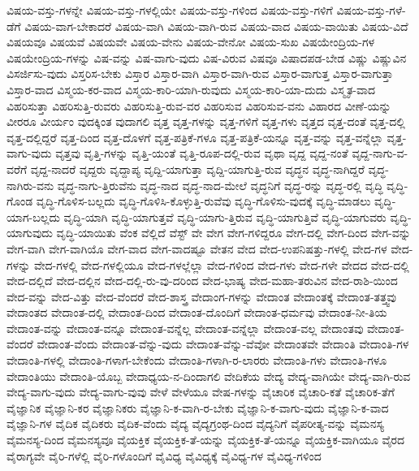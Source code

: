 {ವಿಷಯ-ವಸ್ತು-ಗಳನ್ನೇ
ವಿಷಯ-ವಸ್ತು-ಗಳಲ್ಲಿಯೇ
ವಿಷಯ-ವಸ್ತು-ಗಳಿಂದ
ವಿಷಯ-ವಸ್ತು-ಗಳಿಗೆ
ವಿಷಯ-ವಸ್ತು-ಗಳೆ-ಡೆಗೆ
ವಿಷಯ-ವಾಗ-ಬೇಕಾದರೆ
ವಿಷಯ-ವಾಗಿ
ವಿಷಯ-ವಾಗಿ-ರುವ
ವಿಷಯ-ವಾದ
ವಿಷಯ-ವಾಯಿತು
ವಿಷಯ-ವಿದೆ
ವಿಷಯವೂ
ವಿಷಯವೆ
ವಿಷಯವೇ
ವಿಷಯ-ವೇನು
ವಿಷಯ-ವೇನೋ
ವಿಷಯ-ಸುಖ
ವಿಷಯೇಂದ್ರಿಯ-ಗಳ
ವಿಷಯೇಂದ್ರಿಯ-ಗಳನ್ನು
ವಿಷ-ವನ್ನು
ವಿಷ-ವಾಗು-ವುದು
ವಿಷ-ವಿರುವ
ವಿಷವೂ
ವಿಷಾದಪಡ-ಬೇಡ
ವಿಷ್ಣು
ವಿಷ್ಣುವಿನ
ವಿಸರ್ಜಿಸು-ವುದು
ವಿಸ್ತರಿಸ-ಬೇಕು
ವಿಸ್ತಾರ
ವಿಸ್ತಾರ-ವಾಗಿ
ವಿಸ್ತಾರ-ವಾಗಿ-ರುವ
ವಿಸ್ತಾರ-ವಾಗುತ್ತ
ವಿಸ್ತಾರ-ವಾಗುತ್ತಾ
ವಿಸ್ತಾರ-ವಾದ
ವಿಸ್ಮಯ-ಕರ-ವಾದ
ವಿಸ್ಮಯ-ಕಾರಿ-ಯಾಗಿ-ರುವುದು
ವಿಸ್ಮಯ-ಕಾರಿ-ಯಾ-ದುದು
ವಿಸ್ಮೃತ-ವಾದ
ವಿಹರಿಸುತ್ತಾ
ವಿಹರಿಸುತ್ತಿ-ರುವರು
ವಿಹರಿಸುತ್ತಿ-ರುವ-ವರ
ವಿಹರಿಸುವ
ವಿಹರಿಸುವ-ವನು
ವಿಹಾರದ
ವೀಣೆ-ಯನ್ನು
ವೀರರೂ
ವೀರ್ಯಂ
ವುದಕ್ಕಿಂತ
ವುದಾಗಲಿ
ವೃತ್ತ
ವೃತ್ತ-ಗಳನ್ನು
ವೃತ್ತ-ಗಳಿಗೆ
ವೃತ್ತ-ಗಳು
ವೃತ್ತದ
ವೃತ್ತ-ದಂತೆ
ವೃತ್ತ-ದಲ್ಲಿ
ವೃತ್ತ-ದಲ್ಲಿದ್ದರೆ
ವೃತ್ತ-ದಿಂದ
ವೃತ್ತ-ದೊಳಗೆ
ವೃತ್ತ-ಪತ್ರಿಕೆ-ಗಳೂ
ವೃತ್ತ-ಪತ್ರಿಕೆ-ಯನ್ನೂ
ವೃತ್ತ-ವನ್ನು
ವೃತ್ತ-ವನ್ನೆಲ್ಲಾ
ವೃತ್ತ-ವಾಗು-ವುದು
ವೃತ್ತವು
ವೃತ್ತಿ-ಗಳನ್ನು
ವೃತ್ತಿ-ಯಂತೆ
ವೃತ್ತಿ-ರೂಪ-ದಲ್ಲಿ-ರುವ
ವೃಥಾ
ವೃದ್ದ
ವೃದ್ದ-ನಂತೆ
ವೃದ್ದ-ನಾಗು-ವ-ವರೆಗೆ
ವೃದ್ದ-ನಾದರೆ
ವೃದ್ದರು
ವೃದ್ದಾಪ್ಯ
ವೃದ್ದಿ-ಯಾಗುತ್ತಾ
ವೃದ್ದಿ-ಯಾಗುತ್ತಿ-ರುವ
ವೃದ್ಧನ
ವೃದ್ಧ-ನಾಗಿದ್ದರೆ
ವೃದ್ಧ-ನಾಗಿರು-ವನು
ವೃದ್ಧ-ನಾಗು-ತ್ತಿರುವೆನು
ವೃದ್ಧ-ನಾದ
ವೃದ್ಧ-ನಾದ-ಮೇಲೆ
ವೃದ್ಧನಿಗೆ
ವೃದ್ಧ-ರನ್ನು
ವೃದ್ಧ-ರಲ್ಲಿ
ವೃದ್ಧಿ
ವೃದ್ಧಿ-ಗೊಂಡ
ವೃದ್ಧಿ-ಗೊಳಿಸ-ಬಲ್ಲದು
ವೃದ್ಧಿ-ಗೊಳಿಸಿ-ಕೊಳ್ಳುತ್ತಿ-ರುವೆವು
ವೃದ್ಧಿ-ಗೊಳಿಸು-ವುದಕ್ಕೆ
ವೃದ್ಧಿ-ಮಾಡಲು
ವೃದ್ಧಿ-ಯಾಗ-ಬಲ್ಲದು
ವೃದ್ಧಿ-ಯಾಗಿ
ವೃದ್ಧಿ-ಯಾಗುತ್ತವೆ
ವೃದ್ಧಿ-ಯಾಗು-ತ್ತಿರುವ
ವೃದ್ಧಿ-ಯಾಗುತ್ತಿವೆ
ವೃದ್ಧಿ-ಯಾಗುವರು
ವೃದ್ಧಿ-ಯಾಗುವುದು
ವೃದ್ಧಿ-ಯಾಯಿತು
ವೆಂಕ
ವೆಲ್ಲಿದೆ
ವೆಸ್ಟ್
ವೇ
ವೇಗ
ವೇಗ-ಗಳಿದ್ದರೂ
ವೇಗ-ದಲ್ಲಿ
ವೇಗ-ದಿಂದ
ವೇಗ-ವನ್ನು
ವೇಗ-ವಾಗಿ
ವೇಗ-ವಾಗಿಯೊ
ವೇಗ-ವಾದ
ವೇಗ-ವಾದಷ್ಟೂ
ವೇತನ
ವೇದ
ವೇದ-ಉಪನಿಷತ್ತು-ಗಳಲ್ಲಿ
ವೇದ-ಗಳ
ವೇದ-ಗಳನ್ನು
ವೇದ-ಗಳಲ್ಲಿ
ವೇದ-ಗಳಲ್ಲಿಯೂ
ವೇದ-ಗಳಲ್ಲೆಲ್ಲಾ
ವೇದ-ಗಳಿಂದ
ವೇದ-ಗಳು
ವೇದ-ಗಳೇ
ವೇದದ
ವೇದ-ದಲ್ಲಿ
ವೇದ-ದಲ್ಲಿದೆ
ವೇದ-ದಲ್ಲಿನ
ವೇದ-ದಲ್ಲಿ-ರು-ವು-ದರಿಂದ
ವೇದ-ಭಾಷ್ಯ
ವೇದ-ಮಹಾ-ತರುವಿನ
ವೇದ-ರಾಶಿ-ಯಿಂದ
ವೇದ-ವನ್ನು
ವೇದ-ವಿತ್ತು
ವೇದ-ವೆಂದರೆ
ವೇದ-ಶಾಸ್ತ್ರ
ವೇದಾಂಗ-ಗಳನ್ನು
ವೇದಾಂತ
ವೇದಾಂತಕ್ಕೆ
ವೇದಾಂತ-ತತ್ತ್ವವು
ವೇದಾಂತದ
ವೇದಾಂತ-ದಲ್ಲಿ
ವೇದಾಂತ-ದಿಂದ
ವೇದಾಂತ-ದೊಂದಿಗೆ
ವೇದಾಂತ-ಧರ್ಮವು
ವೇದಾಂತ-ನೀ-ತಿಯ
ವೇದಾಂತ-ವನ್ನು
ವೇದಾಂತ-ವನ್ನೂ
ವೇದಾಂತ-ವನ್ನೆಲ್ಲ
ವೇದಾಂತ-ವನ್ನೆಲ್ಲಾ
ವೇದಾಂತ-ವಲ್ಲ
ವೇದಾಂತವು
ವೇದಾಂತ-ವೆಂದರೆ
ವೇದಾಂತ-ವೆಂದು
ವೇದಾಂತ-ವೆನ್ನು-ವುದು
ವೇದಾಂತ-ವೆನ್ನು-ವೆವೋ
ವೇದಾಂತವೇ
ವೇದಾಂತಿ
ವೇದಾಂತಿ-ಗಳ
ವೇದಾಂತಿ-ಗಳಲ್ಲಿ
ವೇದಾಂತಿ-ಗಳಾಗ-ಬೇಕೆಂದು
ವೇದಾಂತಿ-ಗಳಾಗಿ-ರ-ಲಾರರು
ವೇದಾಂತಿ-ಗಳು
ವೇದಾಂತಿ-ಗಳೂ
ವೇದಾಂತಿಯು
ವೇದಾಂತಿ-ಯೊಬ್ಬ
ವೇದಾಧ್ಯಯ-ನ-ದಿಂದಾಗಲಿ
ವೇದಿಕೆಯ
ವೇದ್ಯ
ವೇದ್ಯ-ವಾಗಿಯೇ
ವೇದ್ಯ-ವಾಗಿ-ರುವ
ವೇದ್ಯ-ವಾಗು-ವುದು
ವೇದ್ಯ-ವಾಗು-ವುವು
ವೇಳೆ
ವೇಳೆಯೂ
ವೇಷ-ಗಳನ್ನು
ವೈಚಾರಿಕ
ವೈಚಾರಿ-ಕತೆ
ವೈಚಾರಿಕ-ತೆಗೆ
ವೈಜ್ಞಾನಿಕ
ವೈಜ್ಞಾನಿ-ಕರ
ವೈಜ್ಞಾನಿಕರು
ವೈಜ್ಞಾನಿ-ಕ-ವಾಗಿ-ರ-ಬೇಕು
ವೈಜ್ಞಾನಿ-ಕ-ವಾಗು-ವುದು
ವೈಜ್ಞಾನಿ-ಕ-ವಾದ
ವೈಜ್ಞಾನಿ-ಗಳ
ವೈದಿಕ
ವೈದಿಕರು
ವೈದಿಕ-ವೆಂದು
ವೈದ್ಯ
ವೈದ್ಯಗ್ರಂಥ-ದಿಂದ
ವೈದ್ಯನಿಗೆ
ವೈಪರೀತ್ಯ-ವನ್ನು
ವೈಮನಸ್ಯ
ವೈಮನಸ್ಯ-ದಿಂದ
ವೈಮನಸ್ಯವೂ
ವೈಯಕ್ತಿಕ
ವೈಯಕ್ತಿಕ-ತೆ-ಯನ್ನು
ವೈಯಕ್ತಿಕ-ತೆ-ಯನ್ನೂ
ವೈಯಕ್ತಿಕ-ವಾಗಿಯೂ
ವೈರದ
ವೈರಾಗ್ಯವೇ
ವೈರಿ-ಗಳೆಲ್ಲಿ
ವೈರಿ-ಗಳೊಂದಿಗೆ
ವೈವಿಧ್ಯ
ವೈವಿಧ್ಯಕ್ಕೆ
ವೈವಿಧ್ಯ-ಗಳ
ವೈವಿಧ್ಯ-ಗಳಿಂದ
}
